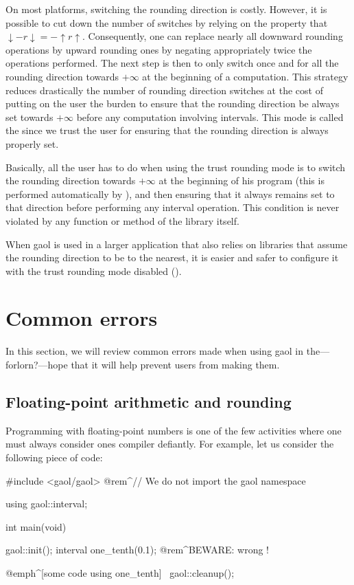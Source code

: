 \documentclass{manual}
\newcommand{\roundDn}[1]{\ensuremath{\downarrow#1\downarrow}}
\newcommand{\roundUp}[1]{\ensuremath{\uparrow#1\uparrow}}
\begin{document}
On most platforms, switching the rounding direction is costly.
However, it is possible to cut down the number of switches
by relying on the property that
$\roundDn{-r}=-\roundUp{r}$. Consequently, one can
replace nearly all downward rounding operations by upward rounding ones
by negating appropriately twice the operations performed. The next step
is then to only switch once and for all the rounding direction towards
$+\infty{}$ at the beginning of a computation. This strategy
reduces drastically the number of rounding direction switches at the cost of
putting on the user the burden to ensure that the rounding direction
be always set towards $+\infty{}$ before any computation involving
intervals. This mode is called the  since
we trust the user for ensuring that the rounding direction is always
properly set.

Basically, all the user has to do when using the trust rounding mode
is to switch the rounding direction towards $+\infty{}$ at the beginning of
his program (this is performed automatically by ),
and then ensuring that it always remains set to that direction
before performing any interval operation. This
condition is never violated by any function or method of the library
itself.

When gaol is used in a larger application that also relies on libraries that assume the rounding
\important%
direction to be to the nearest, it is easier and safer to configure it with the trust rounding
mode disabled ().

\section{Common errors}

In this section, we will review common errors made when using gaol in
the---forlorn?---hope that it will help prevent users from making
them.

\subsection{Floating-point arithmetic and rounding}

Programming with floating-point numbers is one of the few activities
where one must always consider ones compiler defiantly. For example, let
us consider the following piece of code:

\begin{example}
#include <gaol/gaol>  @rem^// We do not import the gaol namespace~

using gaol::interval;

int main(void) {
  gaol::init();
  interval one_tenth(0.1); @rem^BEWARE: wrong !~

  @emph^[some code using one_tenth]~
  gaol::cleanup();
}
\end{example}
\end{document}
